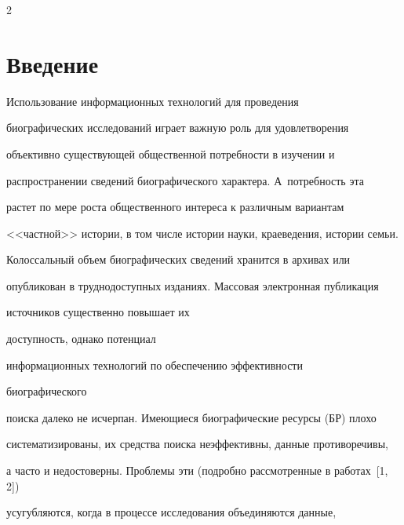       \thispagestyle{headings}





      \begin{multicols}{2}





            \label{st\stat}


  


\section{Введение}


  


  Использование информационных технологий для проведения 


биографических исследований играет важную роль для удовлетворения 


объективно существующей общественной потребности в изучении и 


распространении сведений биографического характера. А~потребность эта 


растет по мере роста общественного интереса к различным вариантам 


<<частной>> истории, в том числе истории науки, краеведения, истории семьи.


  


  Колоссальный объем биографических сведе\-ний хранится в архивах или 


опубликован в труд\-но\-доступных изданиях. Массовая электронная пуб\-ли\-кация 


источников существенно повышает их\linebreak


 доступность, однако потенциал 


информационных технологий по обеспечению эффективности\linebreak


 биографического 


поиска далеко не исчерпан. Име\-ющи\-еся биографические ресурсы (БР) плохо 


сис\-те\-ма\-тизированы, их средства поиска неэффективны, данные противоречивы, 


а часто и недостоверны. Проб\-ле\-мы эти (подробно рассмотренные в работах~[1, 2]) 


усугубляются, когда в процессе исследования объединяются данные, 



\end{multicols}
